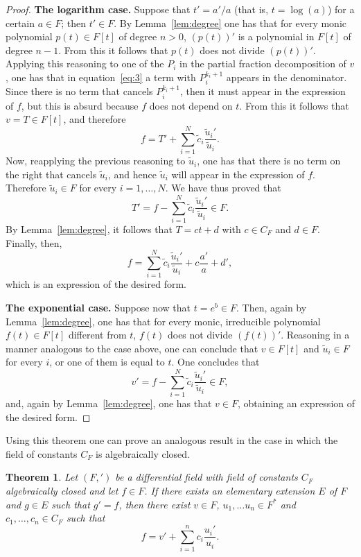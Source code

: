 \documentclass[11pt]{article}
\theoremstyle{plain}
\newtheorem{theorem}{Theorem}
\theoremstyle{definition}
\theoremstyle{remark}
\begin{document}
\begin{proof}
\medskip
\noindent\textbf{The logarithm case.}
Suppose that $t' = a'/a$ (that is, $t = \log(a)$) for a certain
$a \in F$; then $t' \in F$. By Lemma~\ref{lem:degree} one has that for
every monic polynomial $p(t) \in F[t]$ of degree $n > 0$, $(p(t))'$ is
a polynomial in $F[t]$ of degree $n-1$. From this it follows that
$p(t)$ does not divide $(p(t))'$. Applying this reasoning to one of the
$P_{i}$ in the partial fraction decomposition of $v$, one has that in
equation~\eqref{eq:3} a term with $P_{i}^{k_{i}+1}$ appears in the
denominator. Since there is no term that cancels $P_{i}^{k_{i}+1}$,
then it must appear in the expression of $f$, but this is absurd
because $f$ does not depend on $t$. From this it follows that
$v = T \in F[t]$, and therefore
\[
f = T' + \sum_{i=1}^{N} \tilde{c}_{i}
\frac{\tilde{u}_{i}'}{\tilde{u}_{i}}.
\]
Now, reapplying the previous reasoning to $\tilde{u}_{i}$, one has that
there is no term on the right that cancels $\tilde{u}_{i}$, and hence
$\tilde{u}_{i}$ will appear in the expression of $f$. Therefore
$\tilde{u}_{i} \in F$ for every $i = 1, \ldots, N$. We have thus proved
that
\[
T' = f - \sum_{i=1}^{N} \tilde{c}_{i}
\frac{\tilde{u}_{i}'}{\tilde{u}_{i}} \in F.
\]
By Lemma~\ref{lem:degree}, it follows that $T = c t + d$ with
$c \in C_{F}$ and $d \in F$. Finally, then,
\[
f = \sum_{i=1}^{N} \tilde{c}_{i}
\frac{\tilde{u}_{i}'}{\tilde{u}_{i}} + c \frac{a'}{a} + d',
\]
which is an expression of the desired form.

\medskip
\noindent\textbf{The exponential case.}
Suppose now that $t = e^{b} \in F$. Then, again by
Lemma~\ref{lem:degree}, one has that for every monic, irreducible
polynomial $f(t) \in F[t]$ different from $t$, $f(t)$ does not divide
$(f(t))'$. Reasoning in a manner analogous to the case above, one can
conclude that $v \in F[t]$ and $\tilde{u}_{i} \in F$ for every $i$, or
one of them is equal to $t$. One concludes that
\[
v' = f - \sum_{i=1}^{N} \tilde{c}_{i}
\frac{\tilde{u}_{i}'}{\tilde{u}_{i}} \in F,
\]
and, again by Lemma~\ref{lem:degree}, one has that $v \in F$, obtaining
an expression of the desired form.
\end{proof}

Using this theorem one can prove an analogous result in the case in
which the field of constants $C_{F}$ is algebraically closed.

\begin{theorem}\label{thm:liouville-closed}
Let $(F, ')$ be a differential field with field of constants $C_{F}$
algebraically closed and let $f \in F$. If there exists an elementary
extension $E$ of $F$ and $g \in E$ such that $g' = f$, then there exist
$v \in F$, $u_{1}, \ldots u_{n} \in F^{*}$ and
$c_{1}, \ldots, c_{n} \in C_{F}$ such that
\[
f = v' + \sum_{i=1}^{n} c_{i} \frac{u_{i}'}{u_{i}}.
\]
\end{theorem}
\end{document}
